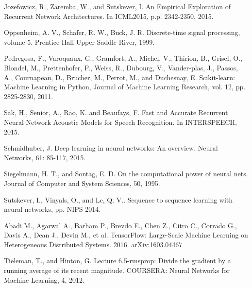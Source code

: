 \documentclass[a4paper,11pt]{article}
\begin{document}
\begin{thebibliography}{1}
 Jozefowicz, R., Zaremba, W., and Sutskever, I. An Empirical Exploration of Recurrent Network Architectures. In ICML2015, p.p. 2342-2350, 2015.




 Oppenheim,  A.  V.,  Schafer, R. W.,  Buck,  J. R. Discrete-time signal processing, volume 5.  Prentice Hall Upper Saddle River, 1999.

 Pedregosa, F., Varoquaux, G.,  Gramfort, A.,  Michel, V., Thirion, B., Grisel, O., Blondel, M., Prettenhofer, P.,  Weiss, R., Dubourg, V.,  Vander-plas, J., Passos, A., Cournapeau, D., Brucher, M., Perrot, M., and Duchesnay, E. Scikit-learn: Machine Learning in Python, Journal of Machine Learning Research, vol. 12, pp. 2825-2830, 2011.


 Sak, H., Senior, A., Rao, K. and Beaufays, F. Fast and Accurate Recurrent Neural Network Acoustic Models for Speech Recognition. In INTERSPEECH, 2015.

  Schmidhuber, J. Deep  learning  in  neural  networks:  An  overview. Neural  Networks,  61: 85-117, 2015.


 Siegelmann, H. T., and Sontag, E. D.  On
the  computational  power  of  neural  nets.
Journal of Computer and System Sciences, 50, 1995.




 Sutskever, I., Vinyals, O., and Le, Q. V.. Sequence to sequence learning with neural networks, pp. NIPS 2014.


  Abadi M., Agarwal A., Barham P., Brevdo E., Chen Z., Citro C., Corrado G., Davis A., Dean J., Devin M., et al. TensorFlow: Large-Scale Machine Learning on Heterogeneous Distributed Systems. 2016. arXiv:1603.04467



 Tieleman, T., and Hinton, G.   Lecture 6.5-rmsprop:  Divide the gradient by a running average of its recent magnitude. COURSERA: Neural Networks for Machine Learning, 4, 2012.



\end{thebibliography}
\end{document}
